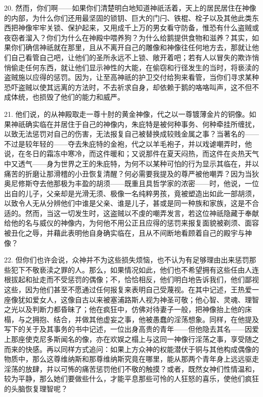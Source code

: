 20. 然而，你们啊——如果你们清楚明白地知道神祇活着，天上的居民居住在神像的内部，为什么你们还用最坚固的锁钥、巨大的门闩、铁棍、栓子以及其他此类东西把神像牢牢关锁、保护起来，又用成千上万的男女看守防备，惟恐有什么盗贼或夜窃者溜入？你们为什么在神殿中喂养狗？为什么给鹅提供食物和滋养？其实，如果你们确信神祇就在那里，且从不离开自己的雕像和神像往任何地方去，那就让他们自己看管自己吧，让他们的圣所永远不上锁、敞开着吧；若有人以冒失的欺诈悄悄偷走任何东西，就让他们显示神性的大能，在偷窃和行径发生的当时，将亵渎的盗贼施以应得的惩罚。因为，让至高神祇的护卫交付给狗来看管，当你们寻求某种恐吓盗贼以使其远离的方法时，不去祈求自身，却依赖于鹅的咯咯叫声，这不但不成体统，也损毁了他们的能力和威严。\par

21. 他们说，的从神殿取走一尊十肘的黄金神像，代之以一尊镀薄金片的铜像。如果神祇确实临在并居住于自己的神像内，朱庇特是被何种事务、何种牵挂所缠扰，以致无法惩罚对自己的伤害，无法报复自己被替换成较贱金属之事？当著名的——不过是较年轻的——夺去朱庇特的金袍，代之以羊毛袍子，并以戏谑嘲弄时，他说，在冬日的霜冻中寒冷，而这件暖和；又说那件在夏天闷热，而这件在炎热天气中又透气——身为世界之王的朱庇特，为何不以某种可怕的行为显示其临在，并以痛苦的折磨让那滑稽的小丑恢复清醒？何必需要我提及的尊严被他嘲弄？因为当狄奥尼修斯夺去他那极为丰盈的胡须——既重且具哲学家的浓密——时，他说，一位出自的儿子，父亲却是光滑无须、极像一名纯粹男孩，竟被塑造出如此一部胡须，以致令人无从分辨他们中谁是父亲、谁是儿子，甚或是同一种族和家族，这是不合适的。然而，当这一切发生时，这盗贼以不虔的嘲弄发言，若这位神祇隐藏于奉献给他的名与威仪的神像内，为何他不用公正且应得的惩罚来报复面貌被剃须、面容被丑化之辱，并藉此表明他自身确实临在，且从不间断地看顾着自己的殿宇与神像？\par

22. 但你们也许会说，众神并不为这些损失烦恼，也不认为有足够理由出来惩罚那些犯下不敬亵渎之罪的人。那么，如果情况如此，他们也不希望拥有这些任由人连根拔起和扯走而不受惩罚的偶像；不，恰恰相反，他们明白地告诉我们，他们鄙视这些，因为他们甚至不愿通过任何报复来表明自己受蔑视。在其中记述，王热爱一座像犹如爱女人，这像自古以来被塞浦路斯人视为神圣可敬；他心智、灵魂、理智之光以及判断力都昏昧了；他在疯狂中，仿佛对待妻子一般，把神像抬上他的床榻，与之拥抱、结合，并做其他虚妄之事，他被愚蠢的淫荡想象。同样，在他提及写下的关于及其事务的书中记述，一位出身高贵的青年——但他隐去其名——因爱上那座使克尼多斯闻名的像，亦在欢娱之榻上与这同一神像行淫荡之事，享受随之而来的快感。再以同样方式追问：如果上方众神的权能潜伏于铜与其他构成偶像的物质中，那么这尊维纳斯和那尊维纳斯究竟在哪里，能从那两个青年身上远远驱走淫荡的放肆，并以可怖的痛苦惩罚他们不敬的触摸？或者，既然女神们性情温和，较为平静，那么她们要做些什么，才能平息那些可怜的人狂怒的喜乐，使他们疯狂的头脑恢复理智呢？\par

